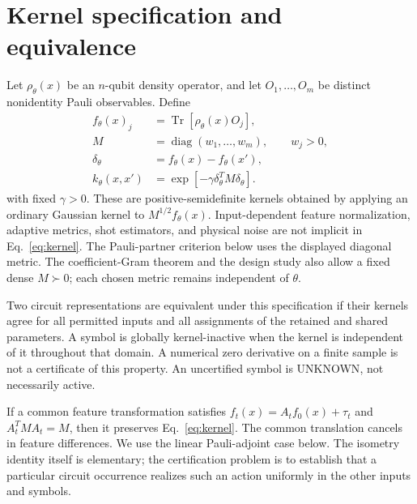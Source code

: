 \documentclass[a4paper,twocolumn,11pt,unpublished]{quantumarticle}
\newcommand{\Tr}{\operatorname{Tr}}
\newcommand{\unknown}{\textnormal{UNKNOWN}}
\newcommand{\diag}{\operatorname{diag}}
\begin{document}
\section{Kernel specification and equivalence}
Let $\rho_\theta(x)$ be an $n$-qubit density operator, and let
$O_1,\ldots,O_m$ be distinct nonidentity Pauli observables. Define
\begin{align}
 f_\theta(x)_j&=\Tr[\rho_\theta(x)O_j],\\
 M&=\diag(w_1,\ldots,w_m),\qquad w_j>0,\\
 \delta_\theta&=f_\theta(x)-f_\theta(x'),\nonumber\\
 k_\theta(x,x')&=\exp[-\gamma\delta_\theta^T M\delta_\theta].\label{eq:kernel}
\end{align}
with fixed $\gamma>0$. These are positive-semidefinite kernels obtained
by applying an ordinary Gaussian kernel to $M^{1/2}f_\theta(x)$.
Input-dependent feature normalization, adaptive metrics, shot estimators,
and physical noise are not implicit in Eq.~\eqref{eq:kernel}.
The Pauli-partner criterion below uses the displayed diagonal metric.
The coefficient-Gram theorem and the design study also allow a fixed
dense $M\succ0$; each chosen metric remains independent of $\theta$.

Two circuit representations are equivalent under this specification
if their kernels agree for all permitted inputs and all assignments
of the retained and shared parameters. A symbol is globally
kernel-inactive when the kernel is independent of it throughout that
domain. A numerical zero derivative on a finite sample is not a
certificate of this property. An uncertified symbol is \unknown,
not necessarily active.

If a common feature transformation satisfies
$f_t(x)=A_t f_0(x)+\tau_t$ and $A_t^T M A_t=M$, then it preserves
Eq.~\eqref{eq:kernel}. The common translation cancels in feature
differences. We use the linear Pauli-adjoint case below. The isometry
identity itself is elementary; the certification problem is to establish
that a particular circuit occurrence realizes such an action uniformly
in the other inputs and symbols.





\end{document}
